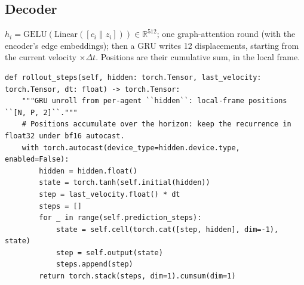 \documentclass[10pt]{article}
\begin{document}
\subsection{Decoder}
$h_i=\mathrm{GELU}(\mathrm{Linear}([c_i\|z_i]))\in\mathbb R^{512}$; one graph-attention round (with the encoder's
edge embeddings); then a GRU writes 12 displacements, starting from the current velocity $\times\Delta t$. Positions
are their cumulative sum, in the local frame.

\par\smallskip{}\par\nopagebreak
\begin{lstlisting}[aboveskip=2pt]
def rollout_steps(self, hidden: torch.Tensor, last_velocity: torch.Tensor, dt: float) -> torch.Tensor:
    """GRU unroll from per-agent ``hidden``: local-frame positions ``[N, P, 2]``."""
    # Positions accumulate over the horizon: keep the recurrence in float32 under bf16 autocast.
    with torch.autocast(device_type=hidden.device.type, enabled=False):
        hidden = hidden.float()
        state = torch.tanh(self.initial(hidden))
        step = last_velocity.float() * dt
        steps = []
        for _ in range(self.prediction_steps):
            state = self.cell(torch.cat([step, hidden], dim=-1), state)
            step = self.output(state)
            steps.append(step)
        return torch.stack(steps, dim=1).cumsum(dim=1)
\end{lstlisting}
\end{document}
